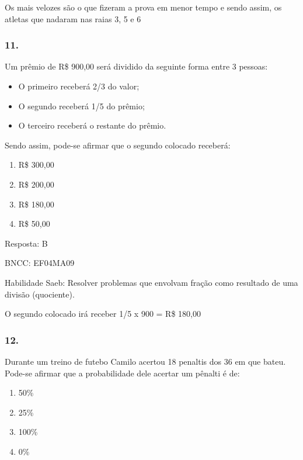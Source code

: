 Os mais velozes são o que fizeram a prova em menor tempo e sendo assim,
os atletas que nadaram nas raias 3, 5 e 6

\subsubsection{11.}\label{section-182}

Um prêmio de R\$ 900,00 será dividido da seguinte forma entre 3 pessoas:

\begin{itemize}
\item
  O primeiro receberá 2/3 do valor;
\item
  O segundo receberá 1/5 do prêmio;
\item
  O terceiro receberá o restante do prêmio.
\end{itemize}

Sendo assim, pode-se afirmar que o segundo colocado receberá:

\begin{enumerate}
\def\labelenumi{\alph{enumi})}
\item
  R\$ 300,00
\item
  R\$ 200,00
\item
  R\$ 180,00
\item
  R\$ 50,00
\end{enumerate}

Resposta: B

BNCC: EF04MA09

Habilidade Saeb: Resolver problemas que envolvam fração como resultado
de uma divisão (quociente).

O segundo colocado irá receber 1/5 x 900 = R\$ 180,00

\subsubsection{12.}\label{section-183}

Durante um treino de futebo Camilo acertou 18 penaltis dos 36 em que
bateu. Pode-se afirmar que a probabilidade dele acertar um pênalti é de:

\begin{enumerate}
\def\labelenumi{\alph{enumi})}
\item
  50\%
\item
  25\%
\item
  100\%
\item
  0\%
\end{enumerate}

